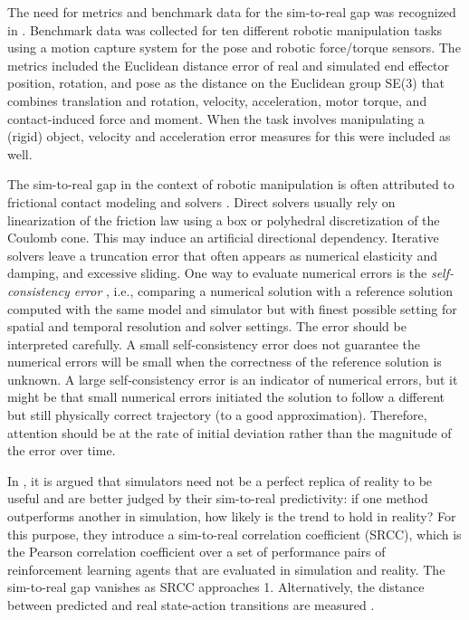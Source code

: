 \documentclass[10pt]{article}
\begin{document}
											  

The need for metrics and benchmark data for the sim-to-real gap was recognized in \cite{collins2019}. 
Benchmark data was collected for ten different robotic manipulation tasks
using a motion capture system for the pose and robotic force/torque sensors. 
The metrics included the Euclidean distance error of real and simulated end effector position, 
rotation, and pose as the distance on the Euclidean group SE(3) that combines translation and rotation, 
velocity, acceleration, motor torque, and contact-induced force and moment. When the task involves 
manipulating a (rigid) object, velocity and acceleration error measures for this were included as well.

				  
					
																																  
																	 
																							

The sim-to-real gap in the context of robotic manipulation is often attributed
to frictional contact modeling and solvers \cite{muratore2022,Horak2019}.  Direct solvers
usually rely on linearization of the friction law using a box or polyhedral
discretization of the Coulomb cone. This may induce an artificial directional
dependency. Iterative solvers leave a truncation error that often appears as numerical
elasticity and damping, and excessive sliding. One way to evaluate numerical errors
is the \emph{self-consistency error} \cite{erez2015}, i.e., comparing a numerical 
solution with a reference solution computed with the same model and simulator but with
finest possible setting for spatial and temporal resolution and solver settings.
The error should be interpreted carefully. A small self-consistency error does not guarantee 
the numerical errors will be small when the correctness of the reference solution is unknown.
A large self-consistency error is an indicator of numerical errors, but it might be that
small numerical errors initiated the solution to follow a different but still 
physically correct trajectory (to a good approximation). Therefore, attention should be
at the rate of initial deviation rather than the magnitude of the error over time. 

In \cite{Kadian2020}, it is argued that simulators need not be a perfect replica of
reality to be useful and are better judged by their sim-to-real predictivity: if one method 
outperforms another in simulation, how likely is the trend to hold in reality? For this 
purpose, they introduce a sim-to-real correlation coefficient (SRCC), which is the Pearson 
correlation coefficient over a set of performance pairs of reinforcement learning agents 
that are evaluated in simulation and reality. The sim-to-real gap vanishes as SRCC approaches 1.
Alternatively, the distance between predicted 
and real state-action transitions are measured \cite{allevato2020}.
\end{document}
